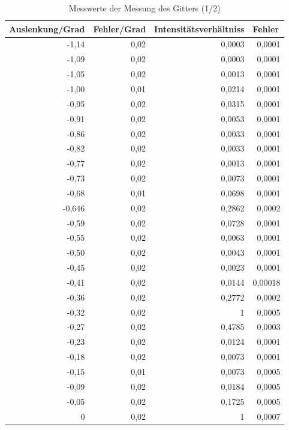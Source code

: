 \documentclass[12pt]{scrartcl}
\begin{document}
\begin{table}[H]
\caption{Messwerte der Messung des Gitters (1/2)}
\begin{center}
\begin{tabular}{|r|r|r|r|}
\hline
\multicolumn{1}{|l|}{Auslenkung/Grad} & \multicolumn{1}{l|}{Fehler/Grad} & \multicolumn{1}{l|}{Intensitätsverhältniss} & \multicolumn{1}{l|}{Fehler} \\ \hline
-1,14 & 0,02 & 0,0003 & 0,0001 \\ \hline
-1,09 & 0,02 & 0,0003 & 0,0001 \\ \hline
-1,05 & 0,02 & 0,0013 & 0,0001 \\ \hline
-1,00 & 0,01 & 0,0214 & 0,0001 \\ \hline
-0,95 & 0,02 & 0,0315 & 0,0001 \\ \hline
-0,91 & 0,02 & 0,0053 & 0,0001 \\ \hline
-0,86 & 0,02 & 0,0033 & 0,0001 \\ \hline
-0,82 & 0,02 & 0,0033 & 0,0001 \\ \hline
-0,77 & 0,02 & 0,0013 & 0,0001 \\ \hline
-0,73 & 0,02 & 0,0073 & 0,0001 \\ \hline
-0,68 & 0,01 & 0,0698 & 0,0001 \\ \hline
-0,646 & 0,02 & 0,2862 & 0,0002 \\ \hline
-0,59 & 0,02 & 0,0728 & 0,0001 \\ \hline
-0,55 & 0,02 & 0,0063 & 0,0001 \\ \hline
-0,50 & 0,02 & 0,0043 & 0,0001 \\ \hline
-0,45 & 0,02 & 0,0023 & 0,0001 \\ \hline
-0,41 & 0,02 & 0,0144 & 0,00018 \\ \hline
-0,36 & 0,02 & 0,2772 & 0,0002 \\ \hline
-0,32 & 0,02 & 1 & 0,0005 \\ \hline
-0,27 & 0,02 & 0,4785 & 0,0003 \\ \hline
-0,23 & 0,02 & 0,0124 & 0,0001 \\ \hline
-0,18 & 0,02 & 0,0073 & 0,0001 \\ \hline
-0,15 & 0,01 & 0,0073 & 0,0005 \\ \hline
-0,09 & 0,02 & 0,0184 & 0,0005 \\ \hline
-0,05 & 0,02 & 0,1725 & 0,0005 \\ \hline
0 & 0,02 & 1 & 0,0007 \\ \hline
\end{tabular}
\end{center}
\label{tab:a_4_e_a}
\end{table}
\end{document}
